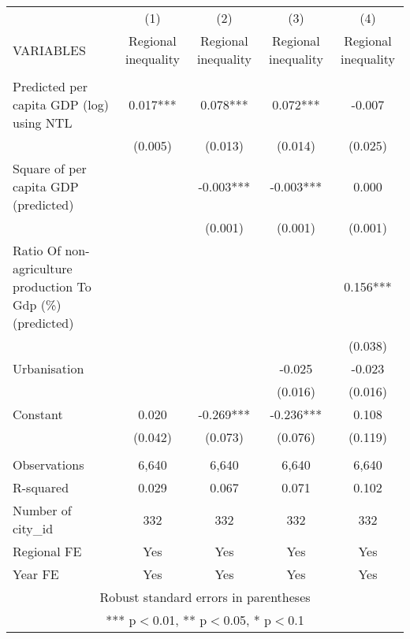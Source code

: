 \documentclass[]{article}
\begin{document}
\begin{tabular}{lcccc} \hline
 & (1) & (2) & (3) & (4) \\
VARIABLES & Regional inequality & Regional inequality & Regional inequality & Regional inequality \\ \hline
 &  &  &  &  \\
Predicted per capita GDP (log) using NTL & 0.017*** & 0.078*** & 0.072*** & -0.007 \\
 & (0.005) & (0.013) & (0.014) & (0.025) \\
Square of per capita GDP (predicted) &  & -0.003*** & -0.003*** & 0.000 \\
 &  & (0.001) & (0.001) & (0.001) \\
Ratio Of non-agriculture production To Gdp (\%) (predicted) &  &  &  & 0.156*** \\
 &  &  &  & (0.038) \\
Urbanisation &  &  & -0.025 & -0.023 \\
 &  &  & (0.016) & (0.016) \\
Constant & 0.020 & -0.269*** & -0.236*** & 0.108 \\
 & (0.042) & (0.073) & (0.076) & (0.119) \\
 &  &  &  &  \\
Observations & 6,640 & 6,640 & 6,640 & 6,640 \\
R-squared & 0.029 & 0.067 & 0.071 & 0.102 \\
Number of city\_id & 332 & 332 & 332 & 332 \\
Regional FE & Yes & Yes & Yes & Yes \\
 Year FE & Yes & Yes & Yes & Yes \\ \hline
\multicolumn{5}{c}{ Robust standard errors in parentheses} \\
\multicolumn{5}{c}{ *** p$<$0.01, ** p$<$0.05, * p$<$0.1} \\
\end{tabular}
\end{document}
